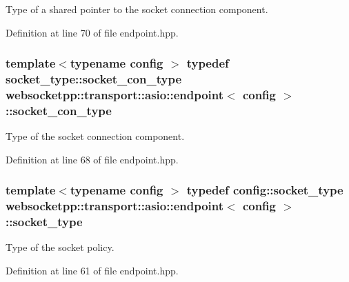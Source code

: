 Type of a shared pointer to the socket connection component. 



Definition at line 70 of file endpoint.\+hpp.

\hypertarget{classwebsocketpp_1_1transport_1_1asio_1_1endpoint_a0b6f8cbdf8f2141915881a6d13779545}{}
\subsubsection[{socket\+\_\+con\+\_\+type}]{\setlength{\rightskip}{0pt plus 5cm}template$<$typename config $>$ typedef socket\+\_\+type\+::socket\+\_\+con\+\_\+type {\bf websocketpp\+::transport\+::asio\+::endpoint}$<$ config $>$\+::{\bf socket\+\_\+con\+\_\+type}}\label{classwebsocketpp_1_1transport_1_1asio_1_1endpoint_a0b6f8cbdf8f2141915881a6d13779545}


Type of the socket connection component. 



Definition at line 68 of file endpoint.\+hpp.

\hypertarget{classwebsocketpp_1_1transport_1_1asio_1_1endpoint_a13784d09af030a55e85faaf8f111fdc3}{}
\subsubsection[{socket\+\_\+type}]{\setlength{\rightskip}{0pt plus 5cm}template$<$typename config $>$ typedef config\+::socket\+\_\+type {\bf websocketpp\+::transport\+::asio\+::endpoint}$<$ config $>$\+::{\bf socket\+\_\+type}}\label{classwebsocketpp_1_1transport_1_1asio_1_1endpoint_a13784d09af030a55e85faaf8f111fdc3}


Type of the socket policy. 



Definition at line 61 of file endpoint.\+hpp.

\hypertarget{classwebsocketpp_1_1transport_1_1asio_1_1endpoint_a1802f5762009dbed117ff793fa87468f}{}

